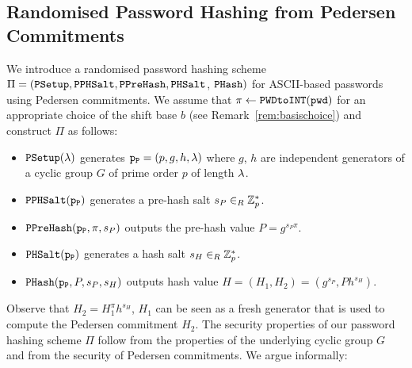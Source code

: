 \subsection{Randomised Password Hashing from Pedersen Commitments}\label{sec:pwhashped}
We introduce a randomised password hashing scheme $\Pi=(\mathtt{PSetup},\mathtt{PPHSalt},\allowbreak\mathtt{PPreHash},\allowbreak\mathtt{PHSalt}$, $\mathtt{PHash})$ for \ac{ASCII}-based passwords using Pedersen commitments. We assume that $\pi\gets\texttt{PWDtoINT}(\mathtt{pwd})$ for an appropriate choice of the shift base $b$ (see Remark~\ref{rem:basischoice}) and construct $\Pi$ as follows:
\begin{itemize}
	\item $\mathtt{PSetup}(\lambda)$ generates $\mathtt{p_P}= (p,g,h,\lambda)$ where $g$, $h$ are independent generators of a cyclic group $G$ of prime order $p$ of length $\lambda$.
	\item $\mathtt{PPHSalt}(\mathtt{p_P})$ generates a pre-hash salt $s_P\in_R\mathbb{Z}^\ast_p$.
	\item $\mathtt{PPreHash}(\mathtt{p_P}, \pi, s_P)$ outputs the pre-hash value $P=g^{s_P\pi}$.
	\item $\mathtt{PHSalt}(\mathtt{p_P})$ generates a hash salt $s_H\in_R\mathbb{Z}^\ast_p$.
	\item $\mathtt{PHash}(\mathtt{p_P}, P, s_P, s_H)$ outputs hash value $H=(H_1, H_2)=(g^{s_P}, Ph^{s_H})$.
\end{itemize}
Observe that $H_2=H_1^\pi h^{s_H}$, \ie $H_1$ can be seen as a fresh generator that is used to compute the Pedersen commitment $H_2$.
The security properties of our password hashing scheme $\Pi$ follow from the properties of the underlying cyclic group $G$ and from the security of Pedersen commitments. We argue informally:
